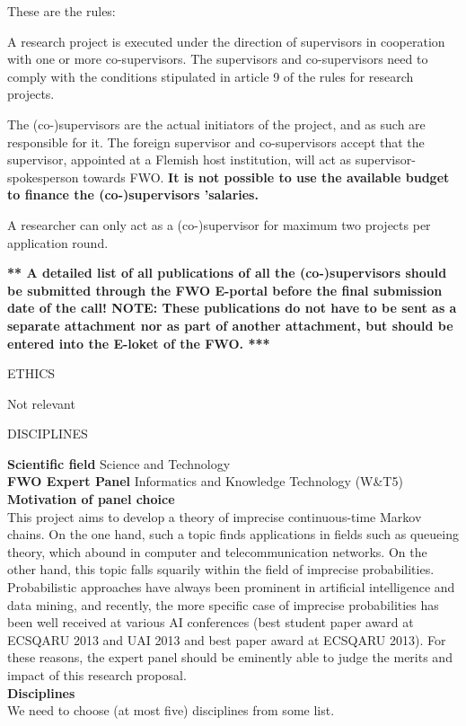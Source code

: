 \documentclass[11pt,dvipsnames,usenames,a4paper]{article}
\begin{document}


{\color{Gray}
These are the rules:

A research project is executed under the direction of supervisors in cooperation with one or more co-supervisors. The supervisors and co-supervisors need to comply with the conditions stipulated in article 9 of the rules for research projects.

The (co-)supervisors are the actual initiators of the project, and as such are responsible for it. The foreign supervisor and co-supervisors accept that the supervisor, appointed at a Flemish host institution, will act as supervisor-spokesperson towards FWO. {\bf It is not possible to use the available budget to finance the (co-)supervisors ’salaries.}

A researcher can only act as a (co-)supervisor for maximum two projects per application round.
}

{\color{blue}\bf *** A detailed list of all publications of all the (co-)supervisors should be submitted through the FWO E-portal before the final submission date of the call!
NOTE: These publications do not have to be sent as a separate attachment nor as part of another attachment, but should be entered into the E-loket of the FWO. ***}

\vspace{5mm}

\begin{shaded}\centering ETHICS \end{shaded}

Not relevant

\vspace{5mm}

\begin{shaded}\centering DISCIPLINES \end{shaded}

{\bf Scientific field} \tab Science and Technology \\
{\bf FWO Expert Panel} \tab Informatics and Knowledge Technology (W\&T5) \\[8pt]
{\bf Motivation of panel choice}\\[6pt]
This project aims to develop a theory of imprecise continuous-time Markov chains. On the one hand, such a topic finds applications in fields such as queueing theory, which abound in computer and telecommunication networks. On the other hand, this topic falls squarily within the field of imprecise probabilities. Probabilistic approaches have always been prominent in artificial intelligence and data mining, and recently, the more specific case of imprecise probabilities has been well received at various AI conferences (best student paper award at ECSQARU 2013 and UAI 2013 and best paper award at ECSQARU 2013). For these reasons, the expert panel should be eminently able to judge the merits and impact of this research proposal.\\[8pt]
{\bf Disciplines}\\[6pt]
We need to choose (at most five) disciplines from some list.
\end{document}
